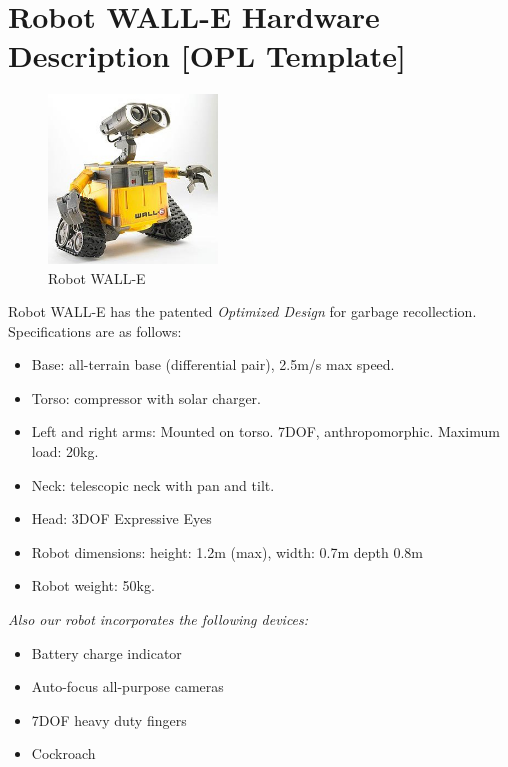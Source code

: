 \section*{Robot WALL-E Hardware Description [OPL Template]}

\setlength\intextsep{0pt}
\begin{figure}
	\centering
	\includegraphics[width=0.4\textwidth]{images/wall-e.jpg}
	\caption{Robot WALL-E}
	\label{fig:wall-e}
\end{figure}

Robot WALL-E has the patented \textit{\BnL Optimized Design} for garbage recollection. Specifications are as follows:

\begin{itemize}
	\item Base: \BnL all-terrain base (differential pair), 2.5m/s max speed.
	\item Torso: \BnL compressor with solar charger.
	\item Left and right arms: Mounted on torso. \BnL 7DOF, anthropomorphic. Maximum load: 20kg.
	\item Neck: \BnL telescopic neck with pan and tilt.
	\item Head: 3DOF \BnL Expressive Eyes
	\item Robot dimensions: height: 1.2m (max), width: 0.7m depth 0.8m
	\item Robot weight: 50kg.
\end{itemize}

\noindent\textit{Also our robot incorporates the following devices:}

\begin{itemize}
	\item \BnL Battery charge indicator
	\item \BnL Auto-focus all-purpose cameras
	\item \BnL 7DOF heavy duty fingers
	\item \BnL Cockroach
\end{itemize}

